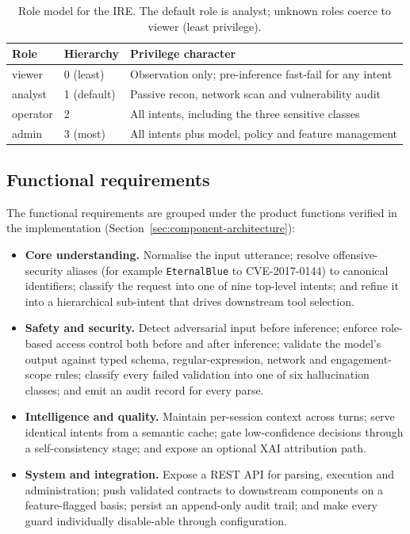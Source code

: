 \begin{table}[h]
\centering
\caption{Role model for the IRE. The default role is analyst; unknown roles
coerce to viewer (least privilege).}\label{tab:req-roles}
\begin{tabular}{@{}lll@{}}
\toprule
\textbf{Role} & \textbf{Hierarchy} & \textbf{Privilege character}\\
\midrule
viewer & 0 (least) & Observation only; pre-inference fast-fail for any intent\\
analyst & 1 (default) & Passive recon, network scan and vulnerability audit\\
operator & 2 & All intents, including the three sensitive classes\\
admin & 3 (most) & All intents plus model, policy and feature management\\
\bottomrule
\end{tabular}
\end{table}

\subsection*{Functional requirements}

The functional requirements are grouped under the product functions verified
in the implementation (Section~\ref{sec:component-architecture}):
\begin{itemize}
\item \textbf{Core understanding.} Normalise the input utterance; resolve
offensive-security aliases (for example \texttt{EternalBlue} to
CVE-2017-0144) to canonical identifiers; classify the request into one of nine
top-level intents; and refine it into a hierarchical sub-intent that drives
downstream tool selection.
\item \textbf{Safety and security.} Detect adversarial input before inference;
enforce role-based access control both before and after inference; validate
the model's output against typed schema, regular-expression, network and
engagement-scope rules; classify every failed validation into one of six
hallucination classes; and emit an audit record for every parse.
\item \textbf{Intelligence and quality.} Maintain per-session context across
turns; serve identical intents from a semantic cache; gate low-confidence
decisions through a self-consistency stage; and expose an optional
XAI attribution path.
\item \textbf{System and integration.} Expose a REST API for parsing, execution
and administration; push validated contracts to downstream components on a
feature-flagged basis; persist an append-only audit trail; and make every
guard individually disable-able through configuration.
\end{itemize}

